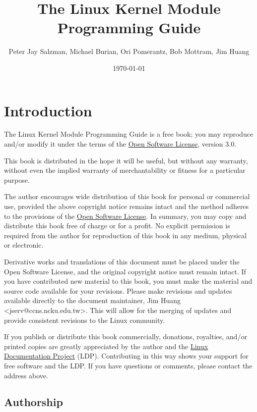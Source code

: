 \documentclass[10pt, oneside]{book}
\author{Peter Jay Salzman, Michael Burian, Ori Pomerantz, Bob Mottram, Jim Huang}
\date{\today}
\title{The Linux Kernel Module Programming Guide}
\begin{document}
\maketitle
\ifdefined\HCode
\else
\tableofcontents
\fi

\section{Introduction}
\label{sec:introduction}
The Linux Kernel Module Programming Guide is a free book; you may reproduce and/or modify it under the terms of the \href{https://opensource.org/licenses/OSL-3.0}{Open Software License}, version 3.0.

This book is distributed in the hope it will be useful, but without any warranty, without even the implied warranty of merchantability or fitness for a particular purpose.

The author encourages wide distribution of this book for personal or commercial use, provided the above copyright notice remains intact and the method adheres to the provisions of the \href{https://opensource.org/licenses/OSL-3.0}{Open Software License}.
In summary, you may copy and distribute this book free of charge or for a profit. No explicit permission is required from the author for reproduction of this book in any medium, physical or electronic.

Derivative works and translations of this document must be placed under the Open Software License, and the original copyright notice must remain intact.
If you have contributed new material to this book, you must make the material and source code available for your revisions.
Please make revisions and updates available directly to the document maintainer, Jim Huang <jserv@ccns.ncku.edu.tw>.
This will allow for the merging of updates and provide consistent revisions to the Linux community.

If you publish or distribute this book commercially, donations, royalties, and/or printed copies are greatly appreciated by the author and the \href{http://www.tldp.org}{Linux Documentation Project} (LDP).
Contributing in this way shows your support for free software and the LDP. If you have questions or comments, please contact the address above.

\subsection{Authorship}
\label{sec:authorship}
\end{document}
